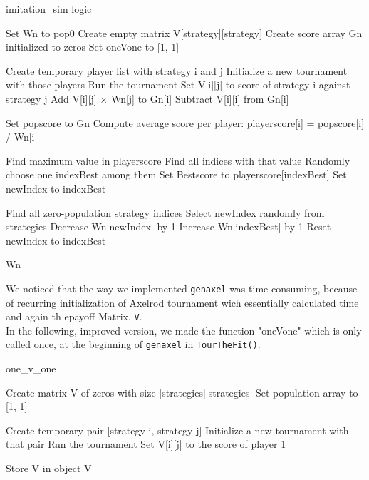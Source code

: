 \documentclass[12pt]{report}
\begin{document}
\begin{algorithm}
\caption{imitation\_sim logic}
\begin{algorithmic}[1]


\State Set Wn to pop0  
\State Create empty matrix V[strategy][strategy]  
\State Create score array Gn initialized to zeros  
\State Set oneVone to [1, 1]

        \State Create temporary player list with strategy i and j  
        \State Initialize a new tournament with those players  
        \State Run the tournament  
        \State Set V[i][j] to score of strategy i against strategy j  
        \State Add V[i][j] $\times$ Wn[j] to Gn[i]  
    \EndFor
    \State Subtract V[i][i] from Gn[i]  
\EndFor

\State Set popscore to Gn  
\State Compute average score per player: playerscore[i] = popscore[i] / Wn[i]  

\State Find maximum value in playerscore  
\State Find all indices with that value  
\State Randomly choose one indexBest among them  
\State Set Bestscore to playerscore[indexBest]  
\State Set newIndex to indexBest

    \State Find all zero-population strategy indices  
            \State Select newIndex randomly from strategies  
        \EndWhile
        \State Decrease Wn[newIndex] by 1  
        \State Increase Wn[indexBest] by 1  
        \State Reset newIndex to indexBest  
    \EndIf
\EndFor

\Return Wn


\end{algorithmic}
\end{algorithm}
We noticed that the way we implemented \texttt{genaxel} was time consuming, because of recurring initialization of Axelrod tournament wich essentially calculated time and again th epayoff Matrix, \texttt{V}.\\
In the following, improved version, we made the function "oneVone" which is only called once, at the beginning of \texttt{genaxel} in \texttt{TourTheFit()}.
\newpage
\begin{algorithm}
\caption{one\_v\_one}
\begin{algorithmic}[1]


\State Create matrix V of zeros with size [strategies][strategies]  
\State Set population array to [1, 1]

        \State Create temporary pair [strategy i, strategy j]  
        \State Initialize a new tournament with that pair  
        \State Run the tournament  
        \State Set V[i][j] to the score of player 1  
    \EndFor
\EndFor

\State Store V in object  
\return V
\end{algorithmic}
\end{algorithm}
\end{document}
